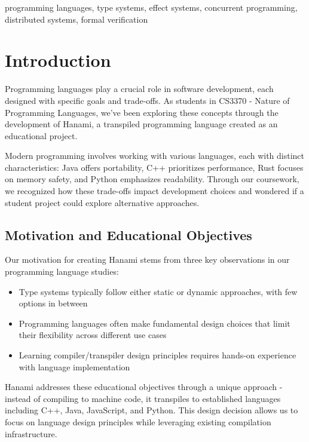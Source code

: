 \documentclass[conference]{IEEEtran}
\begin{document}
	\begin{IEEEkeywords}
		programming languages, type systems, effect systems, concurrent programming, distributed systems, formal verification
	\end{IEEEkeywords}
	
	\newpage
	\tableofcontents
	\newpage
	
	\section{Introduction}
	\label{sec:introduction}
	
	Programming languages play a crucial role in software development, each designed with specific goals and trade-offs. As students in CS3370 - Nature of Programming Languages, we've been exploring these concepts through the development of Hanami, a transpiled programming language created as an educational project.
	
	Modern programming involves working with various languages, each with distinct characteristics: Java offers portability, C++ prioritizes performance, Rust focuses on memory safety, and Python emphasizes readability. Through our coursework, we recognized how these trade-offs impact development choices and wondered if a student project could explore alternative approaches.
	
	\subsection{Motivation and Educational Objectives}
	
	Our motivation for creating Hanami stems from three key observations in our programming language studies:
	
	\begin{itemize}
		\item Type systems typically follow either static or dynamic approaches, with few options in between
		\item Programming languages often make fundamental design choices that limit their flexibility across different use cases
		\item Learning compiler/transpiler design principles requires hands-on experience with language implementation
	\end{itemize}
	
	Hanami addresses these educational objectives through a unique approach - instead of compiling to machine code, it transpiles to established languages including C++, Java, JavaScript, and Python. This design decision allows us to focus on language design principles while leveraging existing compilation infrastructure.
	
\end{document}

